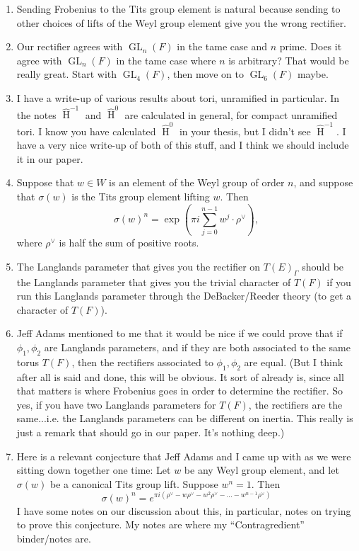 \documentclass{article}
\DeclareMathOperator{\HH}{H}
\DeclareMathOperator{\GL}{GL}
\newcommand{\HT}[1]{\widehat{\HH}^{#1}}
\begin{document}
\begin{enumerate}
\item Sending Frobenius to the Tits group element is natural because sending to other choices of lifts of the Weyl group element give you the wrong rectifier.

\item Our rectifier agrees with $\GL_n(F)$ in the tame case and $n$ prime.  Does it agree with $\GL_n(F)$ in the tame case where $n$ is arbitrary?  That would be really great.  Start with $\GL_4(F)$, then move on to $\GL_6(F)$ maybe.

\item I have a write-up of various results about tori, unramified in particular.  In the notes $\HT{-1}$ and $\HT{0}$ are calculated in general, for compact unramified tori.  I know you have calculated $\HT{0}$ in your thesis, but I didn't see $\HT{-1}$.  I have a very nice write-up of both of this stuff, and I think we should include it in our paper.

\item Suppose that $w \in W$ is an element of the Weyl group of order $n$, and suppose that $\sigma(w)$ is the Tits group element lifting $w$.  Then
$$\sigma(w)^n = \exp\left(\pi i \sum_{j=0}^{n-1} w^j \cdot \rho^\vee\right),$$
where $\rho^{\vee}$ is half the sum of positive roots.

\item The Langlands parameter that gives you the rectifier on $T(E)_{\Gamma}$ should be the Langlands parameter that gives you the trivial character of $T(F)$ if you run this Langlands parameter through the DeBacker/Reeder theory (to get a character of $T(F)$).

\item Jeff Adams mentioned to me that it would be nice if we could prove that if $\phi_1, \phi_2$ are Langlands parameters, and if they are both associated to the same torus $T(F)$, then the rectifiers associated to $\phi_1, \phi_2$ are equal.  (But I think after all is said and done, this will be obvious.  It sort of already is, since all that matters is where Frobenius goes in order to determine the rectifier.  So yes, if you have two Langlands parameters for $T(F)$, the rectifiers are the same...i.e. the Langlands parameters can be different on inertia.  This really is just a remark that should go in our paper.  It's nothing deep.)

\item Here is a relevant conjecture that Jeff Adams and I came up with as we were sitting down together one time: Let $w$ be any Weyl group element, and let $\sigma(w)$ be a canonical Tits group lift.  Suppose $w^n = 1$.  Then $$\sigma(w)^n = e^{\pi i(\rho^{\vee} - w \rho^{\vee} - w^2 \rho^{\vee} - ... - w^{n-1} \rho^{\vee})}$$  I have some notes on our discussion about this, in particular, notes on trying to prove this conjecture.  My notes are where my ``Contragredient'' binder/notes are.


\end{enumerate}
\end{document}
